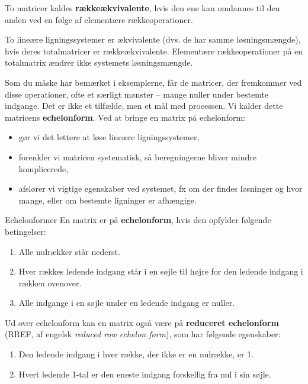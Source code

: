 To matricer kaldes \textbf{rækkeækvivalente}, hvis den ene kan omdannes til den anden ved en følge af elementære rækkeoperationer.

\begin{remark}
To lineære ligningssystemer er ækvivalente (dvs. de har samme løsningsmængde), hvis deres totalmatricer er rækkeækvivalente. Elementære rækkeoperationer på en totalmatrix ændrer ikke systemets løsningsmængde. \end{remark}

Som du måske har bemærket i eksemplerne, får de matricer, der fremkommer ved disse operationer, ofte et særligt mønster -- mange nuller under bestemte indgange. Det er ikke et tilfælde, men et mål med processen. Vi kalder dette matricens \textbf{echelonform}. Ved at bringe en matrix på echelonform:

\begin{itemize}
    \item gør vi det lettere at løse lineære ligningssystemer,
    \item forenkler vi matricen systematisk, så beregningerne bliver mindre komplicerede,
    \item afslører vi vigtige egenskaber ved systemet, fx om der findes løsninger og hvor mange, eller om bestemte ligninger er afhængige.
\end{itemize}

\begin{definition}{Echelonformer}
En matrix er på \textbf{echelonform}, hvis den opfylder følgende betingelser:
\begin{enumerate}
    \item Alle nulrækker står nederst.
    \item Hver rækkes ledende indgang står i en søjle til højre for den ledende indgang i rækken ovenover.
    \item Alle indgange i en søjle under en ledende indgang er nuller.
\end{enumerate}

Ud over echelonform kan en matrix også være på \textbf{reduceret echelonform} (RREF, af engelsk \emph{reduced row echelon form}), som har følgende egenskaber:
\begin{enumerate}[resume]
    \item Den ledende indgang i hver række, der ikke er en nulrække, er 1.
    \item Hvert ledende 1-tal er den eneste indgang forskellig fra nul i sin søjle.
\end{enumerate}
\end{definition}

